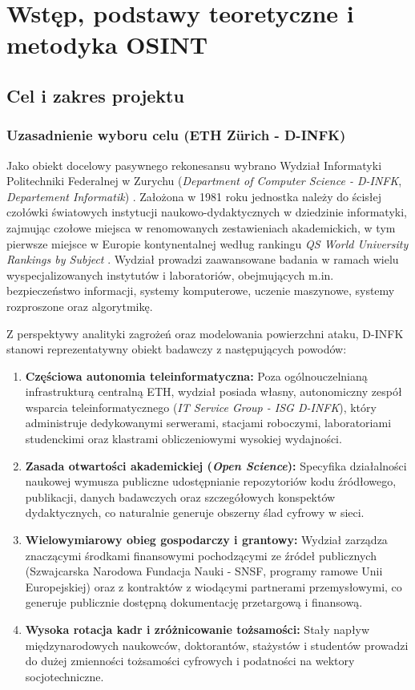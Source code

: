 \chapter{Wstęp, podstawy teoretyczne i metodyka OSINT}\label{ch:wstep}

\section{Cel i zakres projektu}\label{sec:cel-zakres}

\subsection{Uzasadnienie wyboru celu (ETH Zürich - D-INFK)}\label{subsec:wybor-celu}

Jako obiekt docelowy pasywnego rekonesansu wybrano Wydział Informatyki Politechniki Federalnej w Zurychu (\textit{Department of Computer Science - D-INFK}, \textit{Departement Informatik}) \cite{eth_dinfk}. Założona w 1981 roku jednostka należy do ścisłej czołówki światowych instytucji naukowo-dydaktycznych w dziedzinie informatyki, zajmując czołowe miejsca w renomowanych zestawieniach akademickich, w tym pierwsze miejsce w Europie kontynentalnej według rankingu \textit{QS World University Rankings by Subject} \cite{qs_ranking_cs}. Wydział prowadzi zaawansowane badania w ramach wielu wyspecjalizowanych instytutów i laboratoriów, obejmujących m.in. bezpieczeństwo informacji, systemy komputerowe, uczenie maszynowe, systemy rozproszone oraz algorytmikę.

Z perspektywy analityki zagrożeń oraz modelowania powierzchni ataku, D-INFK stanowi reprezentatywny obiekt badawczy z następujących powodów:
\begin{enumerate}
    \item \textbf{Częściowa autonomia teleinformatyczna:} Poza ogólnouczelnianą infrastrukturą centralną ETH, wydział posiada własny, autonomiczny zespół wsparcia teleinformatycznego (\textit{IT Service Group - ISG D-INFK}), który administruje dedykowanymi serwerami, stacjami roboczymi, laboratoriami studenckimi oraz klastrami obliczeniowymi wysokiej wydajności.
    \item \textbf{Zasada otwartości akademickiej (\textit{Open Science}):} Specyfika działalności naukowej wymusza publiczne udostępnianie repozytoriów kodu źródłowego, publikacji, danych badawczych oraz szczegółowych konspektów dydaktycznych, co naturalnie generuje obszerny ślad cyfrowy w sieci.
    \item \textbf{Wielowymiarowy obieg gospodarczy i grantowy:} Wydział zarządza znaczącymi środkami finansowymi pochodzącymi ze źródeł publicznych (Szwajcarska Narodowa Fundacja Nauki - SNSF, programy ramowe Unii Europejskiej) oraz z kontraktów z wiodącymi partnerami przemysłowymi, co generuje publicznie dostępną dokumentację przetargową i finansową.
    \item \textbf{Wysoka rotacja kadr i zróżnicowanie tożsamości:} Stały napływ międzynarodowych naukowców, doktorantów, stażystów i studentów prowadzi do dużej zmienności tożsamości cyfrowych i podatności na wektory socjotechniczne.
\end{enumerate}

